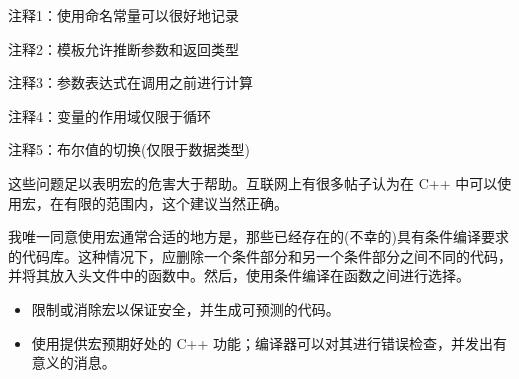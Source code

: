 {\footnotesize
注释1：使用命名常量可以很好地记录

注释2：模板允许推断参数和返回类型

注释3：参数表达式在调用之前进行计算

注释4：变量的作用域仅限于循环

注释5：布尔值的切换(仅限于数据类型)
}

这些问题足以表明宏的危害大于帮助。互联网上有很多帖子认为在 C++ 中可以使用宏，在有限的范围内，这个建议当然正确。

我唯一同意使用宏通常合适的地方是，那些已经存在的(不幸的)具有条件编译要求的代码库。这种情况下，应删除一个条件部分和另一个条件部分之间不同的代码，并将其放入头文件中的函数中。然后，使用条件编译在函数之间进行选择。


\begin{itemize}
\item
限制或消除宏以保证安全，并生成可预测的代码。

\item
使用提供宏预期好处的 C++ 功能；编译器可以对其进行错误检查，并发出有意义的消息。
\end{itemize}













